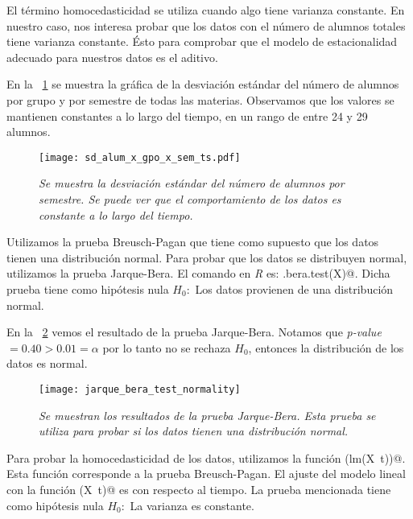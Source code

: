 El término homocedasticidad se utiliza cuando algo tiene varianza constante. En nuestro caso, nos interesa probar que los datos con el número de alumnos totales tiene varianza constante. Ésto para comprobar que el modelo de estacionalidad adecuado para nuestros datos es el aditivo.

En la \figurename{~\ref{sd_alum_x_gpo_x_sem_ts}} se muestra la gráfica de la desviación estándar del número de alumnos por grupo y por semestre de todas las materias. Observamos que los valores se mantienen constantes a lo largo del tiempo, en un rango de entre 24 y 29 alumnos.


\begin{figure}[H]
\centering
\texttt{[image: sd\_alum\_x\_gpo\_x\_sem\_ts.pdf]} %
\caption[\textit{Desviación estándar del número de alumnos por semestre}]{\textit{Se muestra la desviación estándar del número de alumnos por semestre. Se puede ver que el comportamiento de los datos es constante a lo largo del tiempo.}}\label{sd_alum_x_gpo_x_sem_ts}
\end{figure}



Utilizamos la prueba Breusch-Pagan que tiene como supuesto que los datos tienen una distribución normal. Para probar que los datos se distribuyen normal, utilizamos la prueba Jarque-Bera. El comando en \textit{R} es: \verb@jarque.bera.test(X)@. Dicha prueba tiene como hipótesis nula $H_{0}:$ Los datos provienen de una distribución normal.

En la \figurename{~\ref{JarqueBeraTest_normality}} vemos el resultado de la prueba Jarque-Bera. Notamos que \textit{p-value} $ = 0.40 > 0.01 = \alpha$ por lo tanto no se rechaza $H_{0}$, entonces la distribución de los datos es normal.

\begin{figure}[H]
\centering
\texttt{[image: jarque\_bera\_test\_normality]} %
\caption[\textit{Prueba Jarque-Bera para normalidad}]{\textit{Se muestran los resultados de la prueba Jarque-Bera. Esta prueba se utiliza para probar si los datos tienen una distribución normal.}}\label{JarqueBeraTest_normality}
\end{figure}


Para probar la homocedasticidad de los datos, utilizamos la función \verb@bptest(lm(X~t))@. Esta función corresponde a la prueba Breusch-Pagan. El ajuste del modelo lineal con la función \verb@lm(X~t)@ es con respecto al tiempo. La prueba mencionada tiene como hipótesis nula $H_{0}:$ La varianza es constante.

